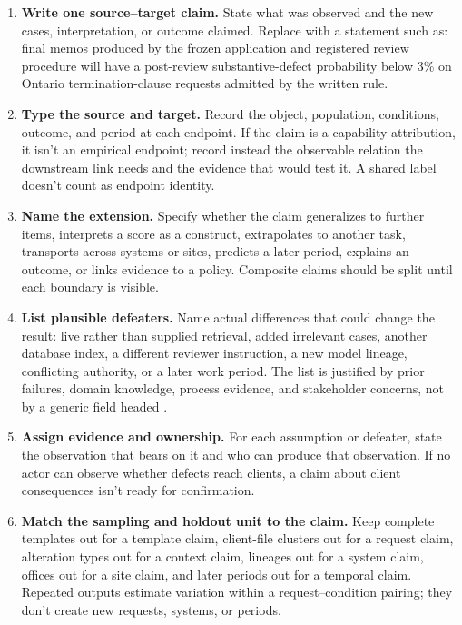 \documentclass[12pt]{article}
\begin{document}
\begin{enumerate}
\item \textbf{Write one source--target claim.} State what was observed and the new cases, interpretation, or outcome claimed. Replace  with a statement such as: final memos produced by the frozen application and registered review procedure will have a post-review substantive-defect probability below 3\% on Ontario termination-clause requests admitted by the written rule.

\item \textbf{Type the source and target.} Record the object, population, conditions, outcome, and period at each endpoint. If the claim is a capability attribution, it isn't an empirical endpoint; record instead the observable relation the downstream link needs and the evidence that would test it. A shared label doesn't count as endpoint identity.

\item \textbf{Name the extension.} Specify whether the claim generalizes to further items, interprets a score as a construct, extrapolates to another task, transports across systems or sites, predicts a later period, explains an outcome, or links evidence to a policy. Composite claims should be split until each boundary is visible.

\item \textbf{List plausible defeaters.} Name actual differences that could change the result: live rather than supplied retrieval, added irrelevant cases, another database index, a different reviewer instruction, a new model lineage, conflicting authority, or a later work period. The list is justified by prior failures, domain knowledge, process evidence, and stakeholder concerns, not by a generic field headed .

\item \textbf{Assign evidence and ownership.} For each assumption or defeater, state the observation that bears on it and who can produce that observation. If no actor can observe whether defects reach clients, a claim about client consequences isn't ready for confirmation.

\item \textbf{Match the sampling and holdout unit to the claim.} Keep complete templates out for a template claim, client-file clusters out for a request claim, alteration types out for a context claim, lineages out for a system claim, offices out for a site claim, and later periods out for a temporal claim. Repeated outputs estimate variation within a request--condition pairing; they don't create new requests, systems, or periods.


\end{enumerate}
\end{document}
